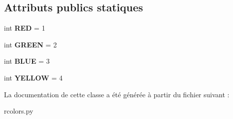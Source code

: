 \subsection*{Attributs publics statiques}
\begin{DoxyCompactItemize}
\item 
\mbox{\label{classrcolors_1_1RColors_a9ec86ff4d44cd118db70f93acf332939}} 
int {\bfseries R\+ED} = 1
\item 
\mbox{\label{classrcolors_1_1RColors_a46f9f9493294a3e212d1b1d6a9381544}} 
int {\bfseries G\+R\+E\+EN} = 2
\item 
\mbox{\label{classrcolors_1_1RColors_af2153d6d9875761b8f0ee0726d514cfb}} 
int {\bfseries B\+L\+UE} = 3
\item 
\mbox{\label{classrcolors_1_1RColors_ae00773aea9e54ddca78695010ec40b67}} 
int {\bfseries Y\+E\+L\+L\+OW} = 4
\end{DoxyCompactItemize}


La documentation de cette classe a été générée à partir du fichier suivant \+:\begin{DoxyCompactItemize}
\item 
rcolors.\+py\end{DoxyCompactItemize}
